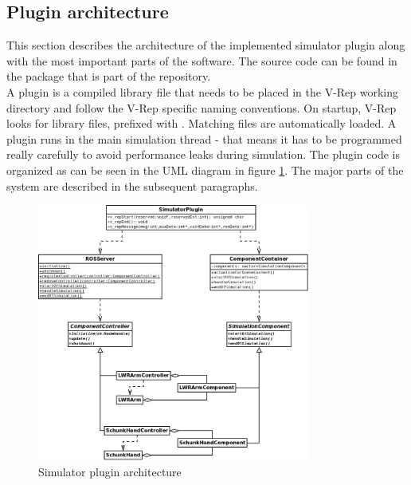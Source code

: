 
\subsection{Plugin architecture}
\label{sec:plugin_arch}

This section describes the architecture of the implemented simulator plugin along with the most important parts of the software. The source code can be found in the  package that is part of the  repository.\\

A plugin is a compiled library file that needs to be placed in the V-Rep working directory and follow the V-Rep specific naming conventions. On startup, V-Rep looks for library files, prefixed with . Matching files are automatically loaded. A plugin runs in the main simulation thread - that means it has to be programmed really carefully to avoid performance leaks during simulation. The plugin code is organized as can be seen in the UML diagram in figure \ref{fig:plugin_uml}. The major parts of the system are described in the subsequent paragraphs.

\begin{figure}
	\centering
  	\includegraphics[width=0.8\textwidth]{images/SimulatorPluginUML.jpg}
	\caption{Simulator plugin architecture}
	\label{fig:plugin_uml}
\end{figure}

